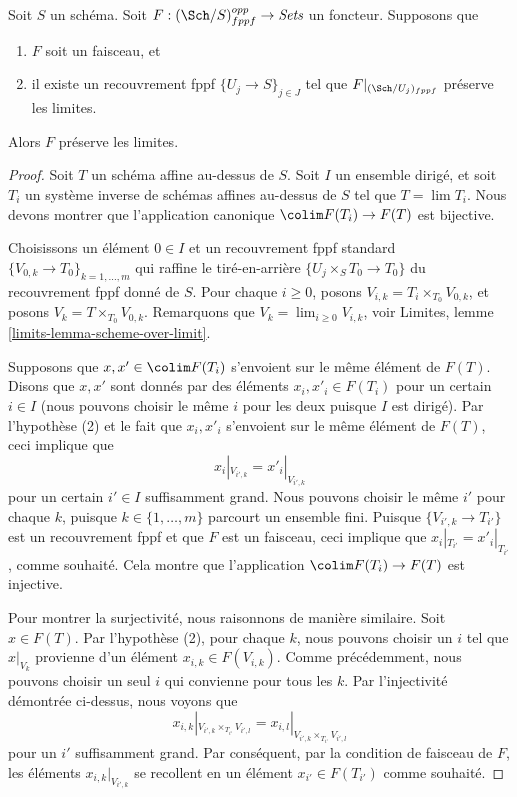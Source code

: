 \begin{lemma}
\label{lemma-sheaf-finite-presentation}
Soit $S$ un schéma.
Soit $F : (\Sch/S)_{fppf}^{opp} \to \textit{Sets}$ un foncteur.
Supposons que
\begin{enumerate}
\item $F$ soit un faisceau, et
\item il existe un recouvrement fppf $\{U_j \to S\}_{j \in J}$ tel que
$F|_{(\Sch/U_j)_{fppf}}$ préserve les limites.
\end{enumerate}
Alors $F$ préserve les limites.
\end{lemma}

\begin{proof}
Soit $T$ un schéma affine au-dessus de $S$.
Soit $I$ un ensemble dirigé, et soit
$T_i$ un système inverse de schémas affines au-dessus de $S$ tel que
$T = \lim T_i$. Nous devons montrer que l'application canonique
$\colim F(T_i) \to F(T)$ est bijective.

\medskip\noindent
Choisissons un élément $0 \in I$ et un recouvrement fppf standard
$\{V_{0, k} \to T_{0}\}_{k = 1, \ldots, m}$ qui raffine
le tiré-en-arrière $\{U_j \times_S T_0 \to T_0\}$ du recouvrement fppf donné de $S$.
Pour chaque $i \geq 0$, posons $V_{i, k} = T_i \times_{T_0} V_{0, k}$, et
posons $V_k = T \times_{T_0} V_{0, k}$. Remarquons que
$V_k = \lim_{i \geq 0} V_{i, k}$, voir
Limites, lemme \ref{limits-lemma-scheme-over-limit}.

\medskip\noindent
Supposons que $x, x' \in \colim F(T_i)$ s'envoient sur le même
élément de $F(T)$. Disons que $x, x'$ sont donnés par des éléments $x_i, x'_i \in F(T_i)$
pour un certain $i \in I$ (nous pouvons choisir le même $i$ pour les deux puisque $I$ est dirigé).
Par l'hypothèse (2) et le fait que $x_i, x'_i$ s'envoient sur le même élément
de $F(T)$, ceci implique que
$$
x_i|_{V_{i', k}} = x'_i|_{V_{i', k}}
$$
pour un certain $i' \in I$ suffisamment grand. Nous pouvons choisir le même $i'$ pour chaque
$k$, puisque $k \in \{1, \ldots, m\}$ parcourt un ensemble fini.
Puisque $\{V_{i', k} \to T_{i'}\}$
est un recouvrement fppf et que $F$ est un faisceau, ceci implique que
$x_i|_{T_{i'}} = x'_i|_{T_{i'}}$, comme souhaité. Cela montre que l'application
$\colim F(T_i) \to F(T)$ est injective.

\medskip\noindent
Pour montrer la surjectivité, nous raisonnons de manière similaire.
Soit $x \in F(T)$. Par l'hypothèse (2), pour chaque $k$, nous
pouvons choisir un $i$ tel que $x|_{V_k}$ provienne d'un
élément $x_{i, k} \in F(V_{i, k})$. Comme précédemment, nous pouvons choisir un
seul $i$ qui convienne pour tous les $k$. Par l'injectivité
démontrée ci-dessus, nous voyons que
$$
x_{i, k}|_{V_{i', k} \times_{T_{i'}} V_{i', l}}
=
x_{i, l}|_{V_{i', k} \times_{T_{i'}} V_{i', l}}
$$
pour un $i'$ suffisamment grand. Par conséquent, par la condition de faisceau de $F$,
les éléments $x_{i, k}|_{V_{i', k}}$ se recollent en un élément $x_{i'} \in F(T_{i'})$
comme souhaité.
\end{proof}

